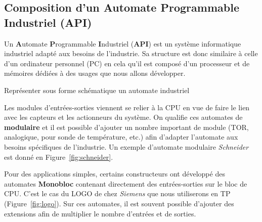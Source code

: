 \subsection{Composition d'un \textbf{A}utomate \textbf{P}rogrammable \textbf{I}ndustriel (\textbf{API})}
Un {\textbf{A}utomate \textbf{P}rogrammable \textbf{I}ndustriel (\textbf{API})} est un système informatique industriel adapté aux besoins de l'industrie. Sa structure est donc similaire à celle d'un ordinateur personnel (PC) en cela qu'il est composé d'un processeur et de mémoires dédiées à des usages que nous allons développer. 

\begin{UPSTIactivite}
    Représenter sous forme schématique un automate industriel
    \begin{center}
    \end{center}   

\end{UPSTIactivite}

Les modules d'entrées-sorties viennent se relier à la CPU en vue de faire le lien avec les capteurs et les actionneurs du système. On qualifie ces automates de \textbf{modulaire} et il est possible d'ajouter un nombre important de module (TOR, analogique, pour sonde de température, etc.) afin d'adapter l'automate aux besoins spécifiques de l'industrie. Un exemple d'automate modulaire \textit{Schneider} est donné en Figure~\ref{fig:schneider}. 

Pour des applications simples, certains constructeurs ont développé des automates \textbf{Monobloc} contenant directement des entrées-sorties sur le bloc de CPU. C'est le cas du LOGO de chez \textit{Siemens} que nous utiliserons en TP (Figure~\ref{fig:logo}). Sur ces automates, il est souvent possible d'ajouter des extensions afin de multiplier le nombre d'entrées et de sorties. 

